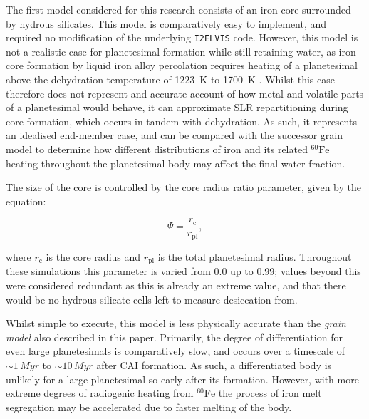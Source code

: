 \documentclass[fleqn,usenatbib]{mnras}
\newcommand{\rms}[1]{\ensuremath{_{\text{#1}}}}
\newcommand{\atom}[2]{$^{#2}\text{#1}$}
\newcommand{\elvis}{\texttt{I2ELVIS}}
\newcommand{\fe}{\atom{Fe}{60}}
\begin{document}
\noindent
The first model considered for this research consists of an iron core surrounded by hydrous silicates.
This model is comparatively easy to implement, and required no modification of the underlying \elvis{} code.
However, this model is not a realistic case for planetesimal formation while still retaining water, as iron core formation by liquid iron alloy percolation requires heating of a planetesimal above the dehydration temperature of \SI{1223}{K} to \SI{1700}{K} \citep{neumannDifferentiationCoreFormation2012}.
Whilst this case therefore does not represent and accurate account of how metal and volatile parts of a planetesimal would behave, it can approximate SLR repartitioning during core formation, which occurs in tandem with dehydration.
As such, it represents an idealised end-member case, and can be compared with the successor grain model to determine how different distributions of iron and its related \fe{} heating throughout the planetesimal body may affect the final water fraction.

The size of the core is controlled by the core radius ratio parameter, given by the equation:

\begin{equation}
  \label{eq:psi}
  \Psi = \frac{r\rms{c}}{r\rms{pl}} , 
\end{equation}

\noindent
where $r\rms{c}$ is the core radius and $r\rms{pl}$ is the total planetesimal radius.
Throughout these simulations this parameter is varied from 0.0 up to 0.99; values beyond this were considered redundant as this is already an extreme value, and that there would be no hydrous silicate cells left to measure desiccation from.

Whilst simple to execute, this model is less physically accurate than the \emph{grain model} also described in this paper.
Primarily, the degree of differentiation for even large planetesimals is comparatively slow, and occurs over a timescale of $\sim 1 \, \si{Myr}$ to $\sim 10 \, \si{Myr}$ after CAI formation.
As such, a differentiated body is unlikely for a large planetesimal so early after its formation.
However, with more extreme degrees of radiogenic heating from \fe{} the process of iron melt segregation may be accelerated due to faster melting of the body.
\end{document}
